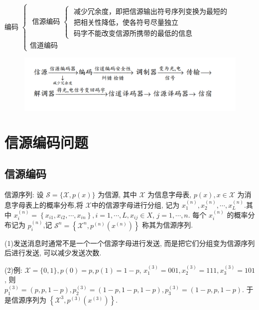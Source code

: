 

编码 $ \left\{\begin{array}{l}\text { 信源编码 }\left\{\begin{array}{l}\text { 减少冗余度，即把信源输出符号序列变换为最短的 } \\ \text { 把相关性降低，使各符号尽量独立 } \\ \text { 码字不能改变信源所携带的最低的信息 }\end{array}\right.\\ \text{信道编码}\end{array}\right. $

\begin{figure}[h]
    \centering
    \includegraphics[width=1\linewidth]{image/2.png}
\end{figure}

\section{信源编码问题}
\subsection{信源编码}
\begin{definition}
     信源序列: 设 $ \mathscr{S}=\{\mathscr{X}, p(x)\} $ 为信源, 其中 $ \mathscr{X} $ 为信息字母表, $ p(x), x \in \mathscr{X} $ 为消息字母表上的概率分布,将 $ \mathscr{X} $中的信源字母进行分组, 记为 $ x_{1}^{(n)}, x_{2}^{(n)}, \cdots, x_{L}^{(n)} $.其中 $ x_{i}^{(n)}=\left\{x_{i 1}, x_{i 2}, \cdots, x_{i n}\right\}, i=1, \cdots, L, x_{i j} \in X $, $ j=1, \cdots, n $. 每个 $ x_{i}^{(n)} $ 的概率分布记为 $ p_{i}^{(n)} $,记 $ \mathscr{S}^{n}=\left\{\mathscr{X}^{n}, p^{(n)}\left(x^{(n)}\right)\right\} $ 称其为信源序列.
\end{definition}

\begin{remark}

(1)发送消息时通常不是一个一个信源字母进行发送, 而是把它们分组变为信源序列后进行发送, 可以减少发送次数.

(2)例: $ \mathscr{X}=\{0,1\}, p(0)=p, p(1)=1-p $,
$x_{1}^{(3)}=001, x_{2}^{(3)}=111, x_{3}^{(3)}=101 $,
 则  $p_{1}^{(3)}=(p, p, 1-p), p_{2}^{(3)}=(1-p, 1-p, 1-p) ,
p_{3}^{(3)}=(1-p, p, 1-p)$.
于是信源序列为 $ \left\{\mathscr{X}^{3}, p^{(3)}\left(x^{(3)}\right)\right\} $.
\end{remark}


